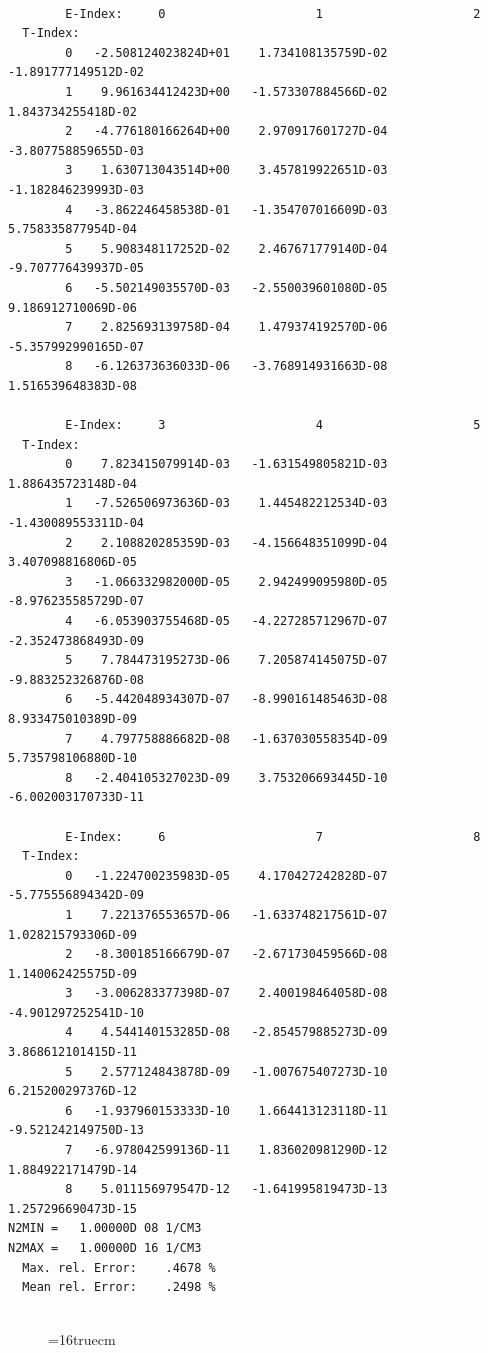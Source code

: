 \documentclass[12pt,dvipdfmx]{article}
\begin{document}
\begin{small}\begin{verbatim}

        E-Index:     0                     1                     2
  T-Index:
        0   -2.508124023824D+01    1.734108135759D-02   -1.891777149512D-02
        1    9.961634412423D+00   -1.573307884566D-02    1.843734255418D-02
        2   -4.776180166264D+00    2.970917601727D-04   -3.807758859655D-03
        3    1.630713043514D+00    3.457819922651D-03   -1.182846239993D-03
        4   -3.862246458538D-01   -1.354707016609D-03    5.758335877954D-04
        5    5.908348117252D-02    2.467671779140D-04   -9.707776439937D-05
        6   -5.502149035570D-03   -2.550039601080D-05    9.186912710069D-06
        7    2.825693139758D-04    1.479374192570D-06   -5.357992990165D-07
        8   -6.126373636033D-06   -3.768914931663D-08    1.516539648383D-08

        E-Index:     3                     4                     5
  T-Index:
        0    7.823415079914D-03   -1.631549805821D-03    1.886435723148D-04
        1   -7.526506973636D-03    1.445482212534D-03   -1.430089553311D-04
        2    2.108820285359D-03   -4.156648351099D-04    3.407098816806D-05
        3   -1.066332982000D-05    2.942499095980D-05   -8.976235585729D-07
        4   -6.053903755468D-05   -4.227285712967D-07   -2.352473868493D-09
        5    7.784473195273D-06    7.205874145075D-07   -9.883252326876D-08
        6   -5.442048934307D-07   -8.990161485463D-08    8.933475010389D-09
        7    4.797758886682D-08   -1.637030558354D-09    5.735798106880D-10
        8   -2.404105327023D-09    3.753206693445D-10   -6.002003170733D-11

        E-Index:     6                     7                     8
  T-Index:
        0   -1.224700235983D-05    4.170427242828D-07   -5.775556894342D-09
        1    7.221376553657D-06   -1.633748217561D-07    1.028215793306D-09
        2   -8.300185166679D-07   -2.671730459566D-08    1.140062425575D-09
        3   -3.006283377398D-07    2.400198464058D-08   -4.901297252541D-10
        4    4.544140153285D-08   -2.854579885273D-09    3.868612101415D-11
        5    2.577124843878D-09   -1.007675407273D-10    6.215200297376D-12
        6   -1.937960153333D-10    1.664413123118D-11   -9.521242149750D-13
        7   -6.978042599136D-11    1.836020981290D-12    1.884922171479D-14
        8    5.011156979547D-12   -1.641995819473D-13    1.257296690473D-15
N2MIN =   1.00000D 08 1/CM3
N2MAX =   1.00000D 16 1/CM3
  Max. rel. Error:    .4678 %
  Mean rel. Error:    .2498 %


\end{verbatim}\end{small}
\begin{figure} \label{2.1.5i}
\epsfxsize=16truecm
\end{figure}
\newpage
\end{document}
